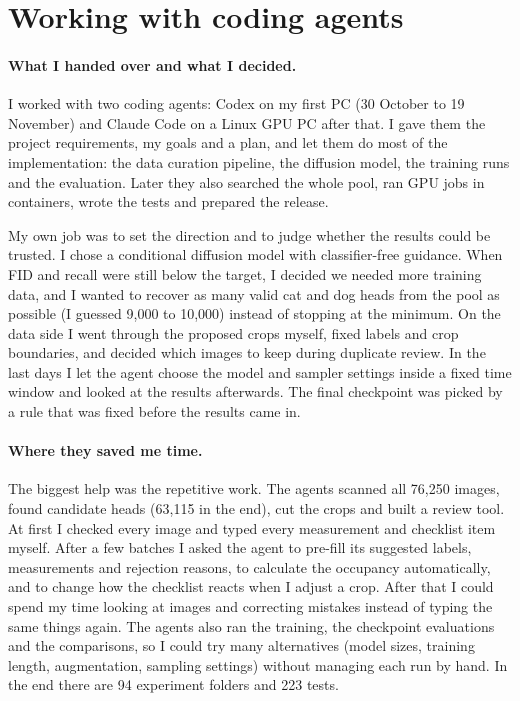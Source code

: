 \documentclass[10pt]{article}
\begin{document}
\section{Working with coding agents}
\paragraph{What I handed over and what I decided.} I worked with two coding agents: Codex on my first PC (30 October to 19 November) and Claude Code on a Linux GPU PC after that. I gave them the project requirements, my goals and a plan, and let them do most of the implementation: the data curation pipeline, the diffusion model, the training runs and the evaluation. Later they also searched the whole pool, ran GPU jobs in containers, wrote the tests and prepared the release.

My own job was to set the direction and to judge whether the results could be trusted. I chose a conditional diffusion model with classifier-free guidance. When FID and recall were still below the target, I decided we needed more training data, and I wanted to recover as many valid cat and dog heads from the pool as possible (I guessed 9{,}000 to 10{,}000) instead of stopping at the minimum. On the data side I went through the proposed crops myself, fixed labels and crop boundaries, and decided which images to keep during duplicate review. In the last days I let the agent choose the model and sampler settings inside a fixed time window and looked at the results afterwards. The final checkpoint was picked by a rule that was fixed before the results came in.

\paragraph{Where they saved me time.} The biggest help was the repetitive work. The agents scanned all 76{,}250 images, found candidate heads (63{,}115 in the end), cut the crops and built a review tool. At first I checked every image and typed every measurement and checklist item myself. After a few batches I asked the agent to pre-fill its suggested labels, measurements and rejection reasons, to calculate the occupancy automatically, and to change how the checklist reacts when I adjust a crop. After that I could spend my time looking at images and correcting mistakes instead of typing the same things again. The agents also ran the training, the checkpoint evaluations and the comparisons, so I could try many alternatives (model sizes, training length, augmentation, sampling settings) without managing each run by hand. In the end there are 94 experiment folders and 223 tests.
\end{document}
